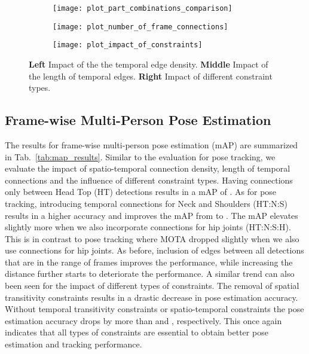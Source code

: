 \documentclass[10pt,twocolumn,letterpaper]{article}
\begin{document}
\begin{figure*}[t]
\captionsetup[subfigure]{justification=centering}
\centering
\begin{subfigure}[t]{0.33\textwidth}
\texttt{[image: plot\_part\_combinations\_comparison]}
\label{fig:contraints-a}
\end{subfigure}
\begin{subfigure}[t]{0.33\textwidth}
\texttt{[image: plot\_number\_of\_frame\_connections]}
\label{fig:contraints-b}
\end{subfigure}
\begin{subfigure}[t]{0.33\textwidth}
\texttt{[image: plot\_impact\_of\_constraints]}
\label{fig:contraints-b}
\end{subfigure}
\vspace{-4mm}
\caption{\textbf{Left} Impact of the the temporal edge density. \textbf{Middle} Impact of the length of temporal edges. \textbf{Right} Impact of different constraint types.\vspace{-5mm}}
\label{fig:MOTAvsMAP}
\end{figure*}
 

\subsection{Frame-wise Multi-Person Pose Estimation}

The results for frame-wise multi-person pose estimation (mAP) are summarized in Tab.~\ref{tab:map_results}. Similar to the evaluation for pose tracking, we evaluate the impact of spatio-temporal connection density, length of temporal connections and the influence of different constraint types. Having connections only between Head Top (HT) detections results in a mAP of . As for pose tracking, introducing temporal connections for Neck and Shoulders (HT:N:S) results in a higher accuracy and improves the mAP from  to . The mAP elevates slightly more when we also incorporate connections for hip joints (HT:N:S:H). This is in contrast to pose tracking where MOTA dropped slightly when we also use connections for hip joints. As before, inclusion of edges between all detections that are in the range of  frames improves the performance, while increasing the distance further  starts to deteriorate the performance. A similar trend can also been seen for the impact of different types of constraints. The removal of spatial transitivity constraints results in a drastic decrease in pose estimation accuracy. Without temporal transitivity constraints or spatio-temporal constraints the pose estimation accuracy drops  by more than  and , respectively. This once again indicates that all types of constraints are essential to obtain better pose estimation and tracking performance. 
\end{document}
